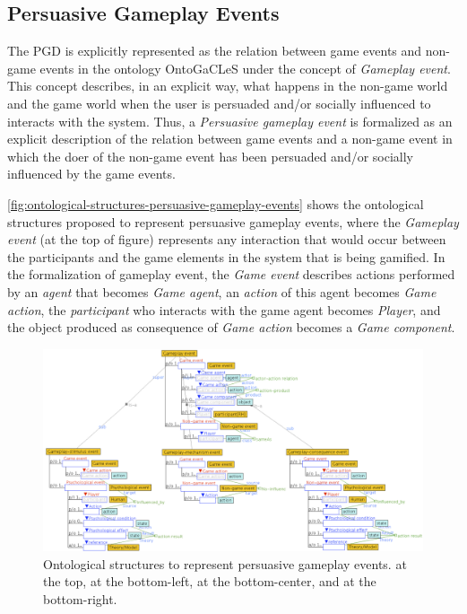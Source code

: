 \subsection{Persuasive Gameplay Events}
\label{subsec:persuasive-gameplay-event}

The PGD is explicitly represented as the relation between game events and non-game events in the ontology OntoGaCLeS under the concept of \emph{Gameplay event}.
This concept describes, in an explicit way, what happens in the non-game world and the game world when the user is persuaded and/or socially influenced to interacts with the system.
Thus, a \emph{Persuasive gameplay event} is formalized as an explicit description of the relation between game events and a non-game event in which the doer of the non-game event has been persuaded and/or socially influenced by the game events.

\autoref{fig:ontological-structures-persuasive-gameplay-events} shows the ontological structures proposed to represent persuasive gameplay events, where the \emph{Gameplay event} (at the top of figure) represents any interaction that would occur between the participants and the game elements in the system that is being gamified.
In the formalization of gameplay event, the \emph{Game event} describes actions performed by an \emph{agent} that becomes \emph{Game agent}, an \emph{action} of this agent becomes \emph{Game action}, the \emph{participant} who interacts with the game agent becomes \emph{Player}, and the object produced as consequence of \emph{Game action} becomes a \emph{Game component}.

\begin{figure}[!htb]
 \caption[Ontological structures to represent persuasive gameplay events]{Ontological structures to represent persuasive gameplay events.  at the top,  at the bottom-left,  at the bottom-center, and  at the bottom-right.}
 \label{fig:ontological-structures-persuasive-gameplay-events}
 \centering
 \includegraphics[width=1\textwidth]{images/chap-ontogacles2/ontological-structures-persuasive-gameplay-events.png}
 \fautor
\end{figure}

